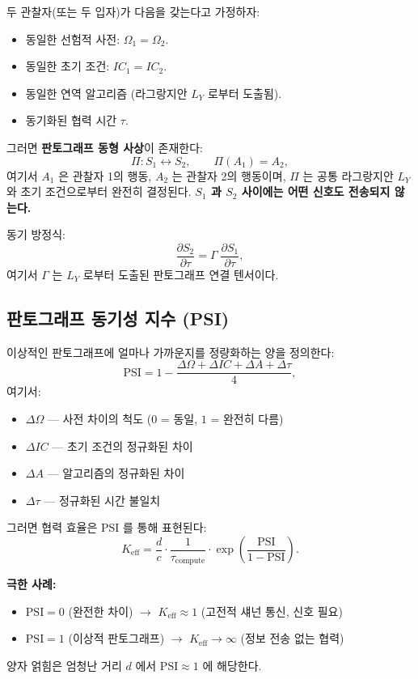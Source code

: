 \documentclass[12pt,a4paper]{article}
\begin{document}
	두 관찰자(또는 두 입자)가 다음을 갖는다고 가정하자:
	\begin{itemize}
		\item 동일한 선험적 사전: \(\Omega_1 = \Omega_2\).
		\item 동일한 초기 조건: \(IC_1 = IC_2\).
		\item 동일한 연역 알고리즘 (라그랑지안 \(L_Y\) 로부터 도출됨).
		\item 동기화된 협력 시간 \(\tau\).
	\end{itemize}
	
	그러면 \textbf{판토그래프 동형 사상}이 존재한다:
	\[
	\Pi: S_1 \leftrightarrow S_2, \qquad \Pi(A_1) = A_2,
	\]
	여기서 \(A_1\) 은 관찰자 1의 행동, \(A_2\) 는 관찰자 2의 행동이며, \(\Pi\) 는 공통 라그랑지안 \(L_Y\) 와 초기 조건으로부터 완전히 결정된다. \textbf{\(S_1\) 과 \(S_2\) 사이에는 어떤 신호도 전송되지 않는다.}
	
	동기 방정식:
	\[
	\frac{\partial S_2}{\partial \tau} = \Gamma \; \frac{\partial S_1}{\partial \tau},
	\]
	여기서 \(\Gamma\) 는 \(L_Y\) 로부터 도출된 판토그래프 연결 텐서이다.
	
	\subsection{판토그래프 동기성 지수 (PSI)}
	
	이상적인 판토그래프에 얼마나 가까운지를 정량화하는 양을 정의한다:
	\[
	\mathrm{PSI} = 1 - \frac{\Delta\Omega + \Delta IC + \Delta A + \Delta\tau}{4},
	\]
	여기서:
	\begin{itemize}
		\item \(\Delta\Omega\) — 사전 차이의 척도 (\(0\) = 동일, \(1\) = 완전히 다름)
		\item \(\Delta IC\) — 초기 조건의 정규화된 차이
		\item \(\Delta A\) — 알고리즘의 정규화된 차이
		\item \(\Delta\tau\) — 정규화된 시간 불일치
	\end{itemize}
	
	그러면 협력 효율은 PSI 를 통해 표현된다:
	\[
	K_{\mathrm{eff}} = \frac{d}{c} \cdot \frac{1}{\tau_{\mathrm{compute}}} \cdot \exp\!\left( \frac{\mathrm{PSI}}{1 - \mathrm{PSI}} \right).
	\]
	
	\textbf{극한 사례:}
	\begin{itemize}
		\item \(\mathrm{PSI} = 0\) (완전한 차이) \(\to\) \(K_{\mathrm{eff}} \approx 1\) (고전적 섀넌 통신, 신호 필요)
		\item \(\mathrm{PSI} = 1\) (이상적 판토그래프) \(\to\) \(K_{\mathrm{eff}} \to \infty\) (정보 전송 없는 협력)
	\end{itemize}
	양자 얽힘은 엄청난 거리 \(d\) 에서 \(\mathrm{PSI} \approx 1\) 에 해당한다.
	
\end{document}
